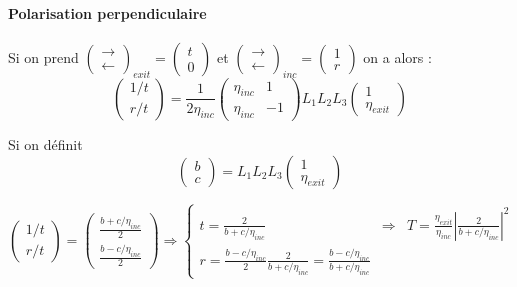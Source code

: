 \documentclass[a4paper,english]{article}
\begin{document}
\paragraph{Polarisation perpendiculaire}

Si on prend $\begin{pmatrix}\rightarrow \\ \leftarrow\end{pmatrix}_{exit} = \begin{pmatrix}t \\ 0\end{pmatrix}$ et $\begin{pmatrix}\rightarrow \\ \leftarrow\end{pmatrix}_{inc} = \begin{pmatrix}1 \\ r\end{pmatrix}$ on a alors :
\begin{dmath}
\begin{pmatrix}1/t \\ r/t \end{pmatrix} = \frac{1}{2 \eta_{inc}} \begin{pmatrix} \eta_{inc} & 1 \\ \eta_{inc} & -1 \end{pmatrix} L_1 L_2 L_3 \begin{pmatrix} 1 \\ \eta_{exit} \end{pmatrix}
\end{dmath}

Si on définit
\begin{dmath}
\begin{pmatrix} b \\ c \end{pmatrix} = L_1 L_2 L_3 \begin{pmatrix} 1 \\ \eta_{exit} \end{pmatrix}
\end{dmath}


\begin{dmath}
\begin{pmatrix}1/t \\ r/t \end{pmatrix} = \begin{pmatrix} \frac{b + c / \eta_{inc}}{2} \\ \frac{b - c / \eta_{inc}}{2} \end{pmatrix} \Rightarrow
\left\{ \begin{array}{lll}
	t = \frac{2}{b + c / \eta_{inc}} &\Rightarrow & T = \frac{\eta_{exit}}{\eta_{inc}} \left| \frac{2}{b + c / \eta_{inc}} \right|^2 \\
	r = \frac{b - c / \eta_{inc}}{2} \frac{2}{b + c / \eta_{inc}} = \frac{b - c / \eta_{inc}}{b + c / \eta_{inc}}
\end{array} \right.
\end{dmath}
\end{document}

